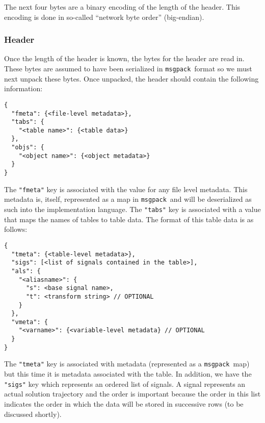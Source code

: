 \documentclass[11pt,a4paper,onecolumn]{article}
\newcommand{\msgpack}{\texttt{msgpack}}
\newcommand{\code}[1]{\texttt{#1}} %
\begin{document}
The next four bytes are a binary encoding of the length of the header.
This encoding is done in so-called ``network byte order''
(big-endian).

\subsubsection{Header}

Once the length of the header is known, the bytes for the header are
read in.  These bytes are assumed to have been serialized in
\msgpack\ format so we must next unpack these bytes.  Once unpacked,
the header should contain the following information:

\begin{verbatim}
{
  "fmeta": {<file-level metadata>},
  "tabs": {
    "<table name>": {<table data>}
  },
  "objs": {
    "<object name>": {<object metadata>}
  }
}
\end{verbatim}

The \code{"fmeta"} key is associated with the value for any file level
metadata.  This metadata is, itself, represented as a map in
\msgpack\ and will be deserialized as such into the implementation
language.  The \code{"tabs"} key is associated with a value that maps
the names of tables to table data.  The format of this table data is
as follows:

\begin{verbatim}
{
  "tmeta": {<table-level metadata>},
  "sigs": [<list of signals contained in the table>],
  "als": {
    "<aliasname>": {
      "s": <base signal name>,
      "t": <transform string> // OPTIONAL
    }
  },
  "vmeta": {
    "<varname>": {<variable-level metadata} // OPTIONAL
  }
}
\end{verbatim}

The \code{"tmeta"} key is associated with metadata (represented as a
\msgpack\ map) but this time it is metadata associated with the table.
In addition, we have the \code{"sigs"} key which represents an ordered
list of signals.  A signal represents an actual solution trajectory
and the order is important because the order in this list indicates
the order in which the data will be stored in successive rows (to be
discussed shortly).
\end{document}
